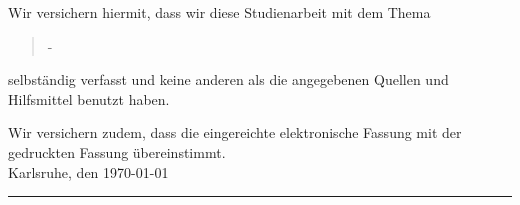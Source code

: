 Wir versichern hiermit, dass wir diese Studienarbeit mit dem Thema
\begin{quote}
\textit{\titel} -\textit{ \untertitel }
\end{quote}
selbständig verfasst und keine anderen als die angegebenen Quellen und Hilfsmittel benutzt haben.


Wir versichern zudem, dass die eingereichte elektronische Fassung mit der gedruckten Fassung übereinstimmt.\\[10ex]

Karlsruhe, den \today \\[4ex]


\rule[-0.2cm]{5cm}{0.5pt} \\

\textsc{\autor} \\[10ex]

